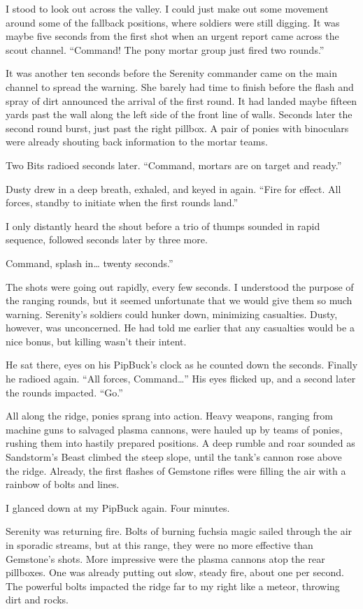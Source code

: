 I stood to look out across the valley. I could just make out some movement around some of the fallback positions, where soldiers were still digging. It was maybe five seconds from the first shot when an urgent report came across the scout channel. “Command! The pony mortar group just fired two rounds.”

It was another ten seconds before the Serenity commander came on the main channel to spread the warning. She barely had time to finish before the flash and spray of dirt announced the arrival of the first round. It had landed maybe fifteen yards past the wall along the left side of the front line of walls. Seconds later the second round burst, just past the right pillbox. A pair of ponies with binoculars were already shouting back information to the mortar teams.

Two Bits radioed seconds later. “Command, mortars are on target and ready.”

Dusty drew in a deep breath, exhaled, and keyed in again. “Fire for effect. All forces, standby to initiate when the first rounds land.”

I only distantly heard the shout before a trio of thumps sounded in rapid sequence, followed seconds later by three more.

\leavevmode{}Command, splash in… twenty seconds.”

The shots were going out rapidly, every few seconds. I understood the purpose of the ranging rounds, but it seemed unfortunate that we would give them so much warning. Serenity’s soldiers could hunker down, minimizing casualties. Dusty, however, was unconcerned. He had told me earlier that any casualties would be a nice bonus, but killing wasn’t their intent.

He sat there, eyes on his PipBuck’s clock as he counted down the seconds. Finally he radioed again. “All forces, Command…” His eyes flicked up, and a second later the rounds impacted. “Go.”

All along the ridge, ponies sprang into action. Heavy weapons, ranging from machine guns to salvaged plasma cannons, were hauled up by teams of ponies, rushing them into hastily prepared positions. A deep rumble and roar sounded as Sandstorm’s Beast climbed the steep slope, until the tank’s cannon rose above the ridge. Already, the first flashes of Gemstone rifles were filling the air with a rainbow of bolts and lines.

I glanced down at my PipBuck again. Four minutes.

Serenity was returning fire. Bolts of burning fuchsia magic sailed through the air in sporadic streams, but at this range, they were no more effective than Gemstone’s shots. More impressive were the plasma cannons atop the rear pillboxes. One was already putting out slow, steady fire, about one per second. The powerful bolts impacted the ridge far to my right like a meteor, throwing dirt and rocks.

